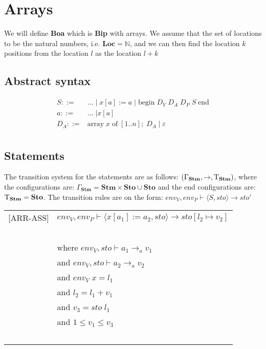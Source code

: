 


\chapter{Arrays}
We will define \textbf{Boa} which is \textbf{Bip} with arrays.
We assume that the set of locations to be the natural numbers, i.e. $\textbf{Loc} = \mathbb{N}$, and we can then find the location $k$ positions from the location $l$ as the location $l + k$

\section{Abstract syntax}
\begin{align*}
S::= & \dots \; | \; x[a]:= a \; | \; \text{begin} \; D_V \; D_A \; D_P \; S \; \text{end} \\
a::= & \dots \; | x[a] \\
D_A::= & \text{array} \; x \; \text{of} \;  [1..n]; \; D_A \; | \; \varepsilon \\
\end{align*}

\section{Statements}
The transition system for the statements are as follows: $(\Gamma_{\mathbf{Stm}}, \rightarrow, \mathrm{T}_{\mathbf{Stm}})$, where the configurations are: $\Gamma_{\mathbf{Stm}} = \textbf{Stm} \times \textbf{Sto} \cup \textbf{Sto}$ and the end configurations are: $\mathrm{T}_{\mathbf{Stm}} = \textbf{Sto}$.
The transition rules are on the form: $env_V, env_P \vdash \langle S, sto \rangle \rightarrow sto'$

\begin{table}[H]
\begin{tabular}{l l}
[ARR-ASS] & $env_V, env_P \vdash \langle x[a_1]:= a_2, sto \rangle \rightarrow sto[l_2 \mapsto v_2]$ \\
~ & ~ \\
~ & \indent\indent where $env_V, sto \vdash a_1 \rightarrow_a v_1$ \\
~ & \indent\indent and $env_V, sto \vdash a_2 \rightarrow_a v_2$ \\
~ & \indent\indent and $env_V \; x = l_1$ \\
~ & \indent\indent and $l_2 = l_1 + v_1$ \\
~ & \indent\indent and $v_3 = sto \; l_1$ \\
~ & \indent\indent and $1 \leq v_1 \leq v_3$ \\
~ & ~\\
\end{tabular}
\end{table}


